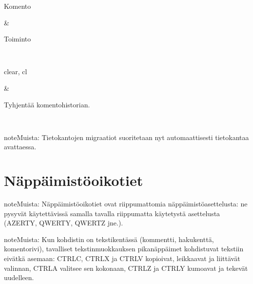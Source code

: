 \documentclass[letterpaper,10pt,finnish]{sphinxmanual}
\begin{document}
\begin{savenotes}\sphinxattablestart
\sphinxthistablewithglobalstyle
\centering
\begin{tabular}[t]{}
\sphinxtoprule
\begin{varwidth}[t]{}
\sphinxstyletheadfamily \sphinxAtStartPar
Komento
\sphinxbeforeendvarwidth
\end{varwidth}%
&\begin{varwidth}[t]{}
\sphinxstyletheadfamily \sphinxAtStartPar
Toiminto
\sphinxbeforeendvarwidth
\end{varwidth}%
\\
\sphinxmidrule
\sphinxtableatstartofbodyhook\begin{varwidth}[t]{}
\sphinxAtStartPar
clear, cl
\sphinxbeforeendvarwidth
\end{varwidth}%
&\begin{varwidth}[t]{}
\sphinxAtStartPar
Tyhjentää komentohistorian.
\sphinxbeforeendvarwidth
\end{varwidth}%
\\
\sphinxbottomrule
\end{tabular}
\sphinxtableafterendhook\par
\sphinxattableend\end{savenotes}

\begin{sphinxadmonition}{note}{Muista:}
\sphinxAtStartPar
Tietokantojen migraatiot suoritetaan nyt automaattisesti tietokantaa avattaessa.
\end{sphinxadmonition}

\sphinxstepscope


\section{Näppäimistöoikotiet}
\label{\detokenize{raccourcis:raccourcis-clavier}}\label{\detokenize{raccourcis:raccourcis}}\label{\detokenize{raccourcis::doc}}
\begin{sphinxadmonition}{note}{Muista:}
\sphinxAtStartPar
Näppäimistöoikotiet ovat riippumattomia näppäimistöasettelusta: ne pysyvät käytettävissä samalla tavalla riippumatta käytetystä asettelusta (AZERTY, QWERTY, QWERTZ jne.).
\end{sphinxadmonition}

\begin{sphinxadmonition}{note}{Muista:}
\sphinxAtStartPar
Kun kohdistin on tekstikentässä (kommentti, hakukenttä, komentorivi), tavalliset tekstinmuokkauksen pikanäppäimet kohdistuvat tekstiin eivätkä asemaan: CTRL\sphinxhyphen{}C, CTRL\sphinxhyphen{}X ja CTRL\sphinxhyphen{}V kopioivat, leikkaavat ja liittävät valinnan, CTRL\sphinxhyphen{}A valitsee sen kokonaan, CTRL\sphinxhyphen{}Z ja CTRL\sphinxhyphen{}Y kumoavat ja tekevät uudelleen.
\end{sphinxadmonition}
\end{document}
